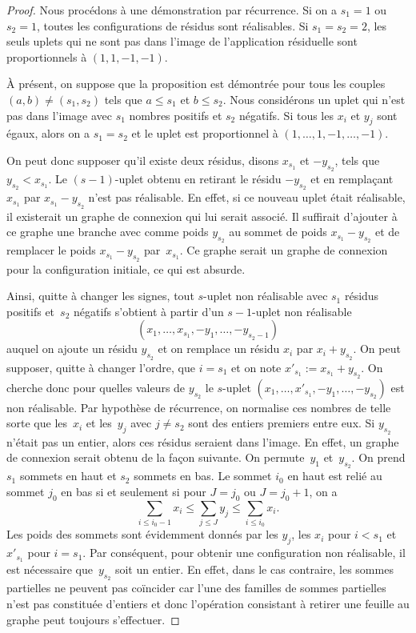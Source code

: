 \documentclass[JEP,XML,SOM,Unicode,francais,NoFloatCountersInSection,published]{cedram}
\theoremstyle{definition}
\begin{document}
\begin{proof}
Nous procédons à une démonstration par récurrence.
Si on a $s_{1}=1$ ou $s_{2}=1$, toutes les configurations de résidus sont réalisables. Si $s_{1}=s_{2}=2$, les seuls uplets qui ne sont pas dans l'image de l'application résiduelle sont proportionnels à $(1,1,-1,-1)$.

À présent, on suppose que la proposition est démontrée pour tous les couples $(a,b)\neq (s_{1},s_{2})$ tels que $a \leq s_{1}$ et $b \leq s_{2}$. Nous considérons un uplet qui n'est pas dans l'image avec $s_{1}$ nombres positifs et $s_{2}$ négatifs. Si tous les $x_{i}$ et $y_{j}$ sont égaux, alors on a $s_{1}=s_{2}$ et le uplet est proportionnel à $(1,\dots,1,-1,\dots,-1)$.

On peut donc supposer qu'il existe deux résidus, disons $x_{s_{1}}$ et $-y_{s_{2}}$, tels que \hbox{$y_{s_{2}}<x_{s_{1}}$}. Le $(s-1)$-uplet obtenu en retirant le résidu $-y_{s_{2}}$ et en remplaçant $x_{s_{1}}$ par $x_{s_{1}}-y_{s_{2}}$ n'est pas réalisable. En effet, si ce nouveau uplet était réalisable, il existerait un graphe de connexion qui lui serait associé. Il suffirait d'ajouter à ce graphe une branche avec comme poids $y_{s_{2}}$ au sommet de poids $x_{s_{1}}-y_{s_{2}}$ et de remplacer le poids $x_{s_{1}}-y_{s_{2}}$ par~$x_{s_{1}}$. Ce graphe serait un graphe de connexion pour la configuration initiale, ce qui est absurde.

Ainsi, quitte à changer les signes, tout $s$-uplet non réalisable avec $s_{1}$ résidus positifs et~$s_{2}$ négatifs s'obtient à partir d'un $s-1$-uplet non réalisable
\[
(x_{1},\dots,x_{s_{1}},-y_{1},\dots,-y_{s_{2}-1})
\]
auquel on ajoute un résidu $y_{s_{2}}$ et on remplace un résidu $x_{i}$ par $x_{i}+y_{s_{2}}$. On peut supposer, quitte à changer l'ordre, que $i=s_{1}$ et on note $x'_{s_{1}}:=x_{s_{1}}+y_{s_{2}}$.
On cherche donc pour quelles valeurs de $y_{s_{2}}$ le $s$-uplet $(x_{1},\dots,x'_{s_{1}},-y_{1},\dots,-y_{s_{2}})$ est non réalisable. Par hypothèse de récurrence, on normalise ces nombres de telle sorte que les~$x_{i}$ et les~$y_{j}$ avec $j\neq s_{2}$ sont des entiers premiers entre eux.
Si $y_{s_{2}}$ n'était pas un entier, alors ces résidus seraient dans l'image. En effet, un graphe de connexion serait obtenu de la façon suivante. On permute~$y_{1}$ et~$y_{s_{2}}$. On prend $s_{1}$ sommets en haut et $s_{2}$ sommets en bas. Le sommet $i_{0}$ en haut est relié au sommet $j_{0}$ en bas si et seulement si pour $J=j_{0}$ ou $J=j_{0}+1$, on a
\[
 \sum_{i\leq i_{0}-1}x_{i}\leq \sum_{j\leq J} y_{j} \leq \sum_{i\leq i_{0}}x_{i}.\]
Les poids des sommets sont évidemment donnés par les $y_{j}$, les $x_{i}$ pour $i<s_{1}$ et~$x'_{s_{1}}$ pour $i=s_{1}$.
Par conséquent, pour obtenir une configuration non réalisable, il est nécessaire que~$y_{s_{2}}$ soit un entier. En effet, dans le cas contraire, les sommes partielles ne peuvent pas coïncider car l'une des familles de sommes partielles n'est pas constituée d'entiers et donc l'opération consistant à retirer une feuille au graphe peut toujours s'effectuer.
\end{proof}
\end{document}
